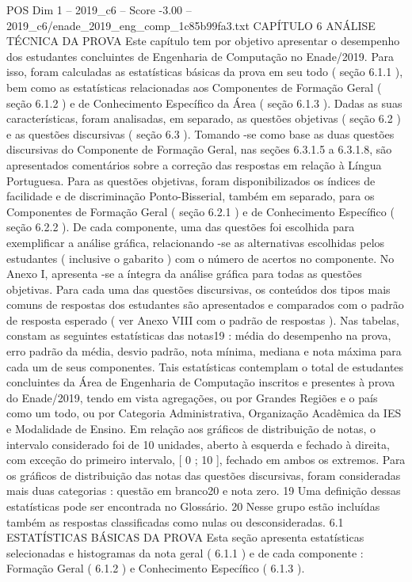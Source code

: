\begin{textsample}{POS Dim 1 – 2019\_c6 – Score -3.00 – 2019\_c6/enade\_2019\_eng\_comp\_1c85b99fa3.txt}  \label{ex:f1_pos_354}
CAPÍTULO 6 ANÁLISE TÉCNICA DA PROVA Este capítulo tem por objetivo apresentar o desempenho dos estudantes concluintes de Engenharia de Computação no Enade/2019.
Para isso, foram calculadas as estatísticas básicas da prova em seu todo ( seção 6.1.1 ), bem como as estatísticas relacionadas aos Componentes de Formação Geral ( seção 6.1.2 ) e de Conhecimento Específico da Área ( seção 6.1.3 ).
Dadas as suas características, foram analisadas, em separado, as questões objetivas ( seção 6.2 ) e as questões discursivas ( seção 6.3 ).
Tomando -se como base as duas questões discursivas do Componente de Formação Geral, nas seções 6.3.1.5 a 6.3.1.8, são apresentados comentários sobre a correção das respostas em relação à Língua Portuguesa.
Para as questões objetivas, foram disponibilizados os índices de facilidade e de discriminação Ponto-Bisserial, também em separado, para os Componentes de Formação Geral ( seção 6.2.1 ) e de Conhecimento Específico ( seção 6.2.2 ).
De cada componente, uma das questões foi escolhida para exemplificar a análise gráfica, relacionando -se as alternativas escolhidas pelos estudantes ( inclusive o gabarito ) com o número de acertos no componente.
No Anexo I, apresenta -se a íntegra da análise gráfica para todas as questões objetivas.
Para cada uma das questões discursivas, os conteúdos dos tipos mais comuns de respostas dos estudantes são apresentados e comparados com o padrão de resposta esperado ( ver Anexo VIII com o padrão de respostas ).
Nas tabelas, constam as seguintes estatísticas das notas19 : média do desempenho na prova, erro padrão da média, desvio padrão, nota mínima, mediana e nota máxima para cada um de seus componentes.
Tais estatísticas contemplam o total de estudantes concluintes da Área de Engenharia de Computação inscritos e presentes à prova do Enade/2019, tendo em vista agregações, ou por Grandes Regiões e o país como um todo, ou por Categoria Administrativa, Organização Acadêmica da IES e Modalidade de Ensino.
Em relação aos gráficos de distribuição de notas, o intervalo considerado foi de 10 unidades, aberto à esquerda e fechado à direita, com exceção do primeiro intervalo, [ 0 ; 10 ], fechado em ambos os extremos.
Para os gráficos de distribuição das notas das questões discursivas, foram consideradas mais duas categorias : questão em branco20 e nota zero. 19 Uma definição dessas estatísticas pode ser encontrada no Glossário. 20 Nesse grupo estão incluídas também as respostas classificadas como nulas ou desconsideradas. 6.1 ESTATÍSTICAS BÁSICAS DA PROVA Esta seção apresenta estatísticas selecionadas e histogramas da nota geral ( 6.1.1 ) e de cada componente : Formação Geral ( 6.1.2 ) e Conhecimento Específico ( 6.1.3 ).

\end{textsample}
